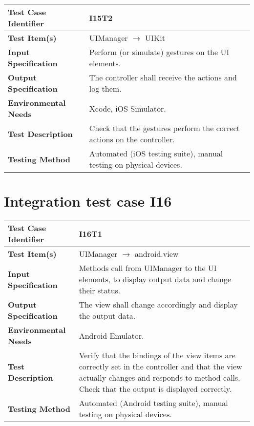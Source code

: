 \vspace{2em}

\noindent\begin{tabular}{l p{}}
    \hline
    \textbf{Test Case Identifier} & I15T2\\
    \hline
    \textbf{Test Item(s)} & UIManager $\rightarrow$ UIKit \\
    \hline
    \textbf{Input Specification} & Perform (or simulate) gestures on the UI elements.\\
    \hline
    \textbf{Output Specification} & The controller shall receive the actions and log them. \\
    \hline
    \textbf{Environmental Needs} & Xcode, iOS Simulator.\\
    \hline
    \textbf{Test Description} & Check that the gestures perform the correct actions on the controller.\\
    \hline
    \textbf{Testing Method} & Automated (iOS testing suite), manual testing on physical devices. \\
    \hline
\end{tabular}

\vspace{2em}

\section{Integration test case I16}

\begin{tabular}{l p{}}
    \hline
    \textbf{Test Case Identifier} & I16T1\\
    \hline
    \textbf{Test Item(s)} & UIManager $\rightarrow$ android.view \\
    \hline
    \textbf{Input Specification} & Methods call from UIManager to the UI elements, to display output data and change their status.\\
    \hline
    \textbf{Output Specification} & The view shall change accordingly and display the output data.\\
    \hline
    \textbf{Environmental Needs} & Android Emulator. \\
    \hline
    \textbf{Test Description} & Verify that the bindings of the view items are correctly set in the controller and that the view actually changes and responds to method calls. Check that the output is displayed correctly.\\
    \hline
    \textbf{Testing Method} & Automated (Android testing suite), manual testing on physical devices. \\
    \hline
\end{tabular}

